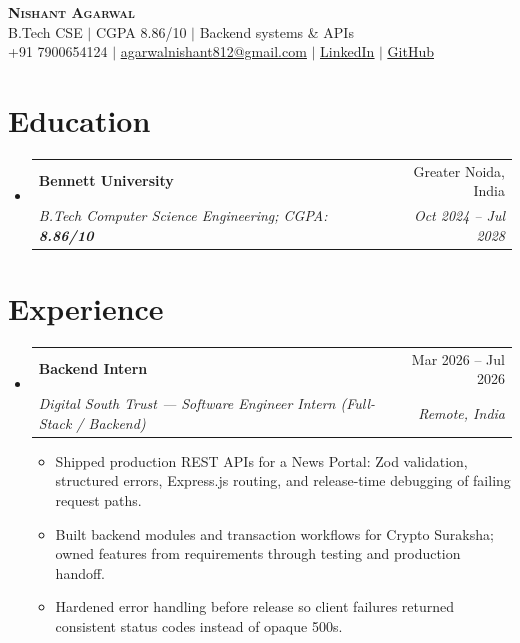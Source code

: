 \documentclass[letterpaper,11pt]{article}
\makeatletter
\newcommand{\resumeItem}[1]{
  \item\small{
    {#1 \vspace{-5pt}}
  }
}
\newcommand{\resumeSubheading}[4]{
  \vspace{-2pt}\item
    \begin{tabular*}{0.97\textwidth}[t]{l@{\extracolsep{\fill}}r}
      \textbf{#1} & #2 \\
      \textit{\small#3} & \textit{\small #4} \\
    \end{tabular*}\vspace{-9pt}
}
\newcommand{\resumeSubHeadingListStart}{\begin{itemize}[leftmargin=0.15in, label={}]}
\newcommand{\resumeSubHeadingListEnd}{\end{itemize}}
\newcommand{\resumeItemListStart}{\begin{itemize}}
\newcommand{\resumeItemListEnd}{\end{itemize}\vspace{-10pt}}
\makeatother
\begin{document}
\begin{center}
  \textbf{\Huge \scshape Nishant Agarwal} \\ \vspace{1pt}
  \small B.Tech CSE $|$ CGPA 8.86/10 $|$ Backend systems \& APIs \\ \vspace{1pt}
  \small +91 7900654124 $|$
  \href{mailto:agarwalnishant812@gmail.com}{\underline{agarwalnishant812@gmail.com}} $|$
  \href{https://www.linkedin.com/in/nishant-agarwal-62a956322/}{\underline{LinkedIn}} $|$
  \href{https://github.com/nishant-uxs}{\underline{GitHub}}
\end{center}

\section{Education}
  \resumeSubHeadingListStart
    \resumeSubheading
      {Bennett University}{Greater Noida, India}
      {B.Tech Computer Science Engineering; CGPA: \textbf{8.86/10}}{Oct 2024 -- Jul 2028}
  \resumeSubHeadingListEnd

\section{Experience}
  \resumeSubHeadingListStart
    \resumeSubheading
      {Backend Intern}{Mar 2026 -- Jul 2026}
      {Digital South Trust --- Software Engineer Intern (Full-Stack / Backend)}{Remote, India}
      \resumeItemListStart
        \resumeItem{Shipped production REST APIs for a News Portal: Zod validation, structured errors, Express.js routing, and release-time debugging of failing request paths.}
        \resumeItem{Built backend modules and transaction workflows for Crypto Suraksha; owned features from requirements through testing and production handoff.}
        \resumeItem{Hardened error handling before release so client failures returned consistent status codes instead of opaque 500s.}
      \resumeItemListEnd
  \resumeSubHeadingListEnd
\end{document}
